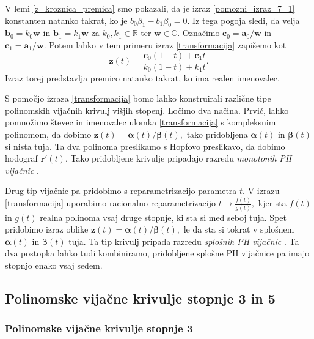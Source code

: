 \documentclass[12pt,a4paper,twoside]{article}
\theoremstyle{definition} %
\theoremstyle{plain} %
\theoremstyle{primerstyle}
\numberwithin{equation}{section}  %
\newcommand{\R}{\mathbb R}
\renewcommand{\C}{\mathbb C}
\newcommand{\aV}{\mathbf{a}}
\newcommand{\bV}{\mathbf{b}}
\newcommand{\cV}{\mathbf{c}}
\newcommand{\rV}{\mathbf{r}}
\newcommand{\wV}{\mathbf{w}}
\newcommand{\zV}{\mathbf{z}}
\newcommand{\balpha}{\boldsymbol \alpha}
\newcommand{\bbeta}{\boldsymbol \beta}
\begin{document}
V lemi \ref{z_kroznica_premica} smo pokazali, da je izraz \eqref{pomozni_izraz_7_1} konstanten natanko takrat, ko je $b_0\beta_1-b_1\beta_0=0.$ Iz tega pogoja sledi, da velja $\bV_0=k_0\wV$ in $\bV_1=k_1\wV$ za $k_0,k_1\in\R$ ter $\wV\in\C.$ Označimo $\cV_0=\aV_0/\wV$ in $\cV_1=\aV_1/\wV.$ Potem lahko v tem primeru izraz \eqref{transformacija} zapišemo kot
\begin{equation*}
	\zV(t)=\frac{\cV_0(1-t)+\cV_1t}{k_0(1-t)+k_1t}.
\end{equation*}
Izraz torej predstavlja premico natanko takrat, ko ima realen imenovalec.

S pomočjo izraza \eqref{transformacija} bomo lahko konstruirali različne tipe polinomskih vijačnih krivulj višjih stopenj. Ločimo dva načina. Prvič, lahko pomnožimo števec in imenovalec ulomka \eqref{transformacija} s kompleksnim polinomom, da dobimo $\zV(t)=\balpha(t)/\bbeta(t),$ tako pridobljena $\balpha(t)$ in $\bbeta(t)$ si nista tuja. Ta dva polinoma preslikamo s Hopfovo preslikavo, da dobimo hodograf $\rV'(t).$ %
Tako pridobljene krivulje pripadajo razredu \emph{monotonih PH vijačnic} \cite[str.\ 371]{faroukietal2004}.

Drug tip vijačnic pa pridobimo s reparametrizacijo parametra $t.$ V izrazu \eqref{transformacija} uporabimo racionalno reparametrizacijo $t\to\frac{f(t)}{g(t)},$ kjer sta $f(t)$ in $g(t)$ realna polinoma vsaj druge stopnje, ki sta si med seboj tuja. Spet pridobimo izraz oblike $\zV(t)=\balpha(t)/\bbeta(t),$ le da sta si tokrat v splošnem $\balpha(t)$ in $\bbeta(t)$ tuja. %
Ta tip krivulj pripada razredu \emph{splošnih PH vijačnic} \cite[str.\ 377]{faroukietal2004}. Ta dva postopka lahko tudi kombiniramo, pridobljene splošne PH vijačnice pa imajo stopnjo enako vsaj sedem.

\subsection{Polinomske vijačne krivulje stopnje 3 in 5}

\subsubsection{Polinomske vijačne krivulje stopnje 3}
\end{document}
